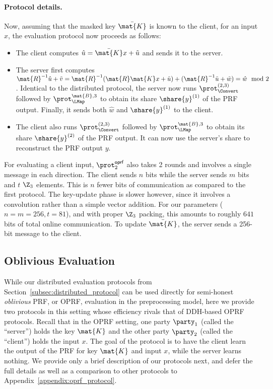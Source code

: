 \paragraph{Protocol details.} Now, assuming that the masked key $\bar{\mat{K}}$ is known to the client, for an input $x$,  the evaluation protocol now proceeds as follows:
\begin{itemize}
  \item The client computes $\hat{u} = \bar{\mat{K}}x + \tilde{u}$ and sends it to the server.

  \item The server first computes $\mat{R}^{-1}\hat{u} + \tilde{v} = \mat{R}^{-1}(\mat{R}\mat{K}x + \tilde{u}) + (\mat{R}^{-1}\tilde{u} + \tilde{w}) = \hat{w} \mod 2$. Identical to the distributed protocol, the server now runs $\prot_\Convert^{(2,3)}$ followed by $\prot_\LMap^{\mat{B},3}$ to obtain its share $\share{y}^{(1)}$ of the PRF output. Finally, it sends both $\hat{w}$ and $\share{y}^{(1)}$ to the client.

  \item The client also runs $\prot_\Convert^{(2,3)}$ followed by $\prot_\LMap^{\mat{B},3}$ to obtain its share $\share{y}^{(2)}$ of the PRF output. It can now use the server's share to reconstruct the PRF output $y$.
\end{itemize}
For evaluating a client input, $\prot^{\textsf{oprf}}_2$ also takes 2 rounds and involves a single message in each direction. The client sends $n$ bits while the server sends $m$ bits and $t$ $\Z_3$ elements. This is $n$ fewer bits of communication as compared to the first protocol. The key-update phase is slower however, since it involves a convolution rather than a simple vector addition. For our parameters ($n=m=256, t=81$), and with proper $\Z_3$ packing, this amounts to roughly $641$ bits of total online communication. To update $\bar{\mat{K}}$, the server sends a 256-bit message to the client.
\else

\subsection{Oblivious Evaluation}
\label{subsec:oprf_protocol}
While our distributed evaluation protocols from Section~\ref{subsec:distributed_protocol} can be used directly for semi-honest \textit{oblivious} PRF, or OPRF, evaluation in the preprocessing model, here we provide two protocols in this setting whose efficiency rivals that of DDH-based OPRF protocols. Recall that in the OPRF setting, one party $\party_1$ (called the ``server'') holds the key $\mat{K}$ and the other party $\party_2$ (called the ``client'') holds the input $x$. The goal of the protocol is to have the client learn the output of the PRF for key $\mat{K}$ and input $x$, while the server learns nothing. We provide only a brief description of our protocols next, and defer the full details as well as a comparison to other protocols to Appendix~\ref{appendix:oprf_protocol}.

